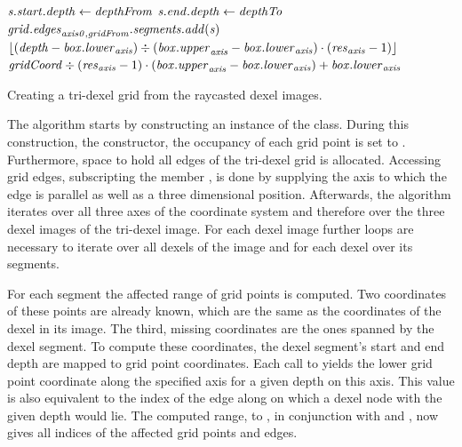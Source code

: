 \begin{algorithm}
\begin{algorithmic}[1]
									\State $\mathit{s}.\mathit{start}.\mathit{depth} \gets \mathit{depthFrom}$
								\EndIf
									\State $\mathit{s}.\mathit{end}.\mathit{depth} \gets \mathit{depthTo}$
								\EndIf
								\State $\mathit{grid}.\mathit{edges}_{\mathit{axis0}, \mathit{gridFrom}}.\mathit{segments}.\mathit{add}(\mathit{s})$ \label{alg:line:grid_edge_insertion}
							\EndFor
						\EndFor
					\EndFor
				\EndFor
			\EndFor
		\EndFunction
		\\
			\State \Return $\lfloor(\mathit{depth} - \mathit{box}.\mathit{lower}_{\mathit{axis}}) \div (\mathit{box}.\mathit{upper}_{\mathit{axis}} - \mathit{box}.\mathit{lower}_{\mathit{axis}}) \cdot (\mathit{res}_{\mathit{axis}} - 1)\rfloor$
		\EndFunction
		\\
			\State \Return $\mathit{gridCoord} \div (\mathit{res}_{\mathit{axis}} - 1) \cdot (\mathit{box}.\mathit{upper}_{\mathit{axis}} - \mathit{box}.\mathit{lower}_{\mathit{axis}}) + \mathit{box}.\mathit{lower}_{\mathit{axis}}$
		\EndFunction
	\end{algorithmic}
	\caption{
		Creating a tri-dexel grid from the raycasted dexel images.
	}
	\label{alg:tri_dexel_grid_generation}
\end{algorithm}
%
The algorithm starts by constructing an instance of the  class.
During this construction, \ie the constructor, the occupancy of each grid point is set to \False.
Furthermore, space to hold all edges of the tri-dexel grid is allocated.
Accessing grid edges, \ie subscripting the member , is done by supplying the axis to which the edge is parallel as well as a three dimensional position.
Afterwards, the algorithm iterates over all three axes of the coordinate system and therefore over the three dexel images of the tri-dexel image.
For each dexel image further loops are necessary to iterate over all dexels of the image and for each dexel over its segments.

For each segment the affected range of grid points is computed.
Two coordinates of these points are already known, which are the same as the coordinates of the dexel in its image.
The third, missing coordinates are the ones spanned by the dexel segment.
To compute these coordinates, the dexel segment's start and end depth are mapped to grid point coordinates.
Each call to  yields the lower grid point coordinate along the specified axis for a given depth on this axis.
This value is also equivalent to the index of the edge along  on which a dexel node with the given depth would lie.
The computed range,  to , in conjunction with  and , now gives all indices of the affected grid points and edges.

